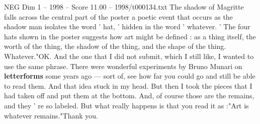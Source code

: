 \begin{textsample}{NEG Dim 1 – 1998 – Score 11.00 – 1998/t000134.txt}
The shadow of Magritte falls across the central part of the poster a poetic event that occurs as the shadow man isolates the word ' hat, ' hidden in the word ' whatever. ' The four hats shown in the poster suggests how art might be defined : as a thing itself, the worth of the thing, the shadow of the thing, and the shape of the thing.
Whatever."OK.
And the one that I did not submit, which I still like, I wanted to use the same phrase.
There were wonderful experiments by Bruno Munari on \textbf{letterforms} some years ago — sort of, see how far you could go and still be able to read them.
And that idea stuck in my head.
But then I took the pieces that I had taken off and put them at the bottom.
And, of course those are the remains, and they ' re so labeled.
But what really happens is that you read it as :"Art is whatever remains."Thank you.

\end{textsample}
